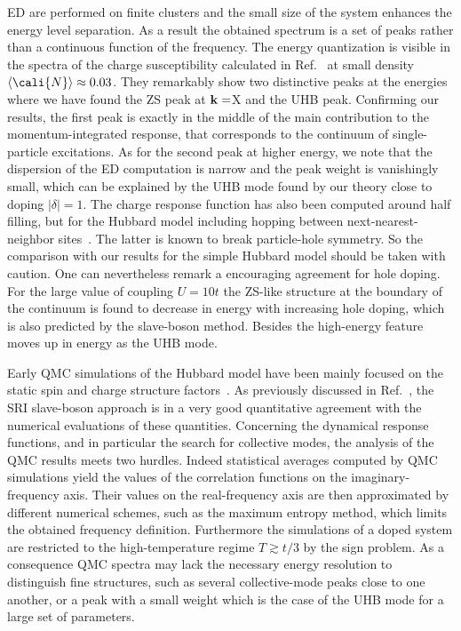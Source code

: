 \documentclass[showpacs,amsmath,twocolumn,floatfix]{revtex4-1}
\begin{document}
ED are performed on finite clusters and the small size of the system enhances the
energy level separation. As a result the obtained spectrum is a set of peaks rather 
than a continuous function of the frequency. The energy quantization is visible
in the spectra of the charge susceptibility calculated in Ref.~\cite{Bun13} at small 
density $\langle \cali{N} \rangle \approx 0.03$. They remarkably show 
two distinctive peaks at the energies where we have found the ZS peak at 
$\bf{k}=$X and the UHB peak. Confirming our results, the first peak is 
exactly in the middle of the main contribution to the momentum-integrated response, 
that corresponds to the continuum of single-particle excitations. As for the 
second peak at higher energy, we note that the dispersion of the ED computation is narrow 
and the peak weight is vanishingly small, which can be explained by the UHB mode found
by our theory close to doping $|\delta|= 1$. The charge response function has also 
been computed around half filling, but for the Hubbard model including hopping between 
next-nearest-neighbor sites~\cite{Jia12,Wan14}. The latter is known to break 
particle-hole symmetry. So the comparison with our results for the simple Hubbard model 
should be taken with caution. One can nevertheless remark a encouraging agreement for 
hole doping. For the large value of coupling $U=10t$ the ZS-like structure at the 
boundary of the continuum is found to decrease in energy with increasing hole doping, 
which is also predicted by the slave-boson method. Besides the high-energy feature 
moves up in energy as the UHB mode.

Early QMC simulations of the Hubbard model have been mainly focused on the static
spin and charge structure factors~\cite{Che94,Buh99,Bec00}. As previously discussed 
in Ref.~\cite{Zim97}, the SRI slave-boson approach is in a very good quantitative 
agreement with the numerical evaluations of these quantities. Concerning the dynamical
response functions, and in particular the search for collective modes, the analysis of 
the QMC results meets two hurdles. Indeed statistical averages computed by QMC 
simulations yield the values of the correlation functions on the imaginary-frequency 
axis. Their values on the real-frequency axis are then approximated by different 
numerical schemes, such as the maximum entropy method, which limits the obtained 
frequency definition. Furthermore the simulations of a doped system are restricted to 
the high-temperature regime $T\gtrsim t/3$ by the sign problem. As a consequence QMC 
spectra may lack the necessary energy resolution to distinguish fine structures, such 
as several collective-mode peaks close to one another, or a peak with a small weight 
which is the case of the UHB mode for a large set of parameters. 
\end{document}
